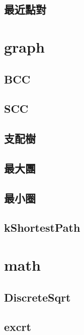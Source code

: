 \documentclass[a4paper,10pt,twocolumn,oneside]{article}
\begin{document}
    \subsection{最近點對}
    
\section{graph}
    \subsection{BCC}
    

    \subsection{SCC}
    

    \subsection{支配樹}
    

    \subsection{最大團}
    

    \subsection{最小圈}
    

    \subsection{kShortestPath}
    

\section{math}
    \subsection{DiscreteSqrt}
    

    \subsection{excrt}
    
\end{document}
